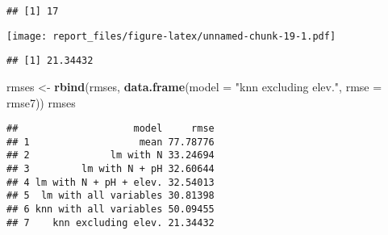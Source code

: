 \documentclass[
]{article}
\newenvironment{Shaded}{\begin{snugshade}}{\end{snugshade}}
\newcommand{\CommentTok}[1]{\textcolor[rgb]{0.56,0.35,0.01}{\textit{#1}}}
\newcommand{\DataTypeTok}[1]{\textcolor[rgb]{0.13,0.29,0.53}{#1}}
\newcommand{\KeywordTok}[1]{\textcolor[rgb]{0.13,0.29,0.53}{\textbf{#1}}}
\newcommand{\NormalTok}[1]{#1}
\newcommand{\OperatorTok}[1]{\textcolor[rgb]{0.81,0.36,0.00}{\textbf{#1}}}
\newcommand{\StringTok}[1]{\textcolor[rgb]{0.31,0.60,0.02}{#1}}
\begin{document}
\begin{verbatim}
## [1] 17
\end{verbatim}

\begin{Shaded}
\end{Shaded}

\texttt{[image: report\_files/figure-latex/unnamed-chunk-19-1.pdf]}

\begin{Shaded}
\end{Shaded}

\begin{verbatim}
## [1] 21.34432
\end{verbatim}

\begin{Shaded}
\begin{Highlighting}[]
\NormalTok{rmses <{-}}\StringTok{ }\KeywordTok{rbind}\NormalTok{(rmses, }
               \KeywordTok{data.frame}\NormalTok{(}\DataTypeTok{model =} \StringTok{"knn excluding elev."}\NormalTok{, }\DataTypeTok{rmse =}\NormalTok{ rmse7))}
\NormalTok{rmses}
\end{Highlighting}
\end{Shaded}

\begin{verbatim}
##                    model     rmse
## 1                   mean 77.78776
## 2              lm with N 33.24694
## 3         lm with N + pH 32.60644
## 4 lm with N + pH + elev. 32.54013
## 5  lm with all variables 30.81398
## 6 knn with all variables 50.09455
## 7    knn excluding elev. 21.34432
\end{verbatim}
\end{document}
